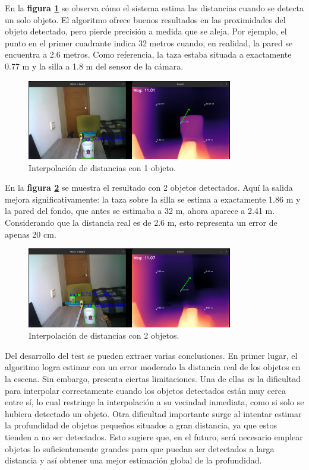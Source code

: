 En la \textbf{figura \ref{fig:1obj_inter}} se observa cómo el sistema estima las distancias cuando se detecta un solo objeto. El algoritmo ofrece buenos resultados en las proximidades del objeto detectado, pero pierde precisión a medida que se aleja. Por ejemplo, el punto en el primer cuadrante indica 32 metros cuando, en realidad, la pared se encuentra a 2.6 metros. Como referencia, la taza estaba situada a exactamente 0.77 m y la silla a 1.8 m del sensor de la cámara.

\begin{figure}[H]
\centering
\includegraphics[width=0.8\textwidth]{images/1objetos_interpolacion.png}
\caption{Interpolación de distancias con 1 objeto.}
\label{fig:1obj_inter}
\end{figure}

En la \textbf{figura \ref{fig:2obj_inter}} se muestra el resultado con 2 objetos detectados. Aquí la salida mejora significativamente: la taza sobre la silla se estima a exactamente 1.86 m y la pared del fondo, que antes se estimaba a 32 m, ahora aparece a 2.41 m. Considerando que la distancia real es de 2.6 m, esto representa un error de apenas 20 cm.

\begin{figure}[H]
\centering
\includegraphics[width=0.8\textwidth]{images/2objetos_interpolacion.png}
\caption{Interpolación de distancias con 2 objetos.}
\label{fig:2obj_inter}
\end{figure}

Del desarrollo del test se pueden extraer varias conclusiones. En primer lugar, el algoritmo logra estimar con un error moderado la distancia real de los objetos en la escena. Sin embargo, presenta ciertas limitaciones. Una de ellas es la dificultad para interpolar correctamente cuando los objetos detectados están muy cerca entre sí, lo cual restringe la interpolación a su vecindad inmediata, como si solo se hubiera detectado un objeto. Otra dificultad importante surge al intentar estimar la profundidad de objetos pequeños situados a gran distancia, ya que estos tienden a no ser detectados. Esto sugiere que, en el futuro, será necesario emplear objetos lo suficientemente grandes para que puedan ser detectados a larga distancia y así obtener una mejor estimación global de la profundidad.


